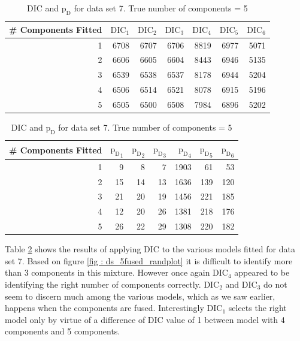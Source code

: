 \begin{table}[!htb]
\centering
\captionsetup{justification=centering}
\caption{DIC and $\text{p}_\text{D}$ for data set 7. True number of components = 5}
\label{table : ds_5fused_dic}
\begin{tabular}{@{}rrrrrrr@{}}
\toprule
\# Components Fitted & $\text{DIC}_1$ & $\text{DIC}_2$  & $\text{DIC}_3$  & $\text{DIC}_4$  & $\text{DIC}_5$  & $\text{DIC}_6$  \\ \midrule
1 & 6708 & 6707 & 6706 & 8819 & 6977 & 5071 \\
2 & 6606 & 6605 & 6604 & 8443 & 6946 & 5135 \\
3 & 6539 & 6538 & 6537 & 8178 & 6944 & 5204 \\
4 & 6506 & 6514 & 6521 & 8078 & 6915 & 5196 \\
5 & 6505 & 6500 & 6508 & 7984 & 6896 & 5202 \\
\bottomrule
\end{tabular}

\begin{tabular}{@{}rrrrrrr@{}}
\toprule
\# Components Fitted & ${\text{p}_\text{D}}_1$ & ${\text{p}_\text{D}}_2$ & ${\text{p}_\text{D}}_3$ & ${\text{p}_\text{D}}_4$ & ${\text{p}_\text{D}}_5$ & ${\text{p}_\text{D}}_6$ \\ \midrule
1 & 9 & 8 & 7 & 1903 & 61 & 53 \\
2 & 15 & 14 & 13 & 1636 & 139 & 120 \\
3 & 21 & 20 & 19 & 1456 & 221 & 185 \\
4 & 12 & 20 & 26 & 1381 & 218 & 176 \\
5 & 26 & 22 & 29 & 1308 & 220 & 182 \\
\bottomrule
\end{tabular}
\end{table}

Table \ref{table : ds_5fused_dic} shows the results of applying DIC to the various models fitted for data set 7. Based on figure \ref{fig : ds_5fused_randplot} it is difficult to identify more than 3 components in this mixture. However once again $\text{DIC}_4$ appeared to be identifying the right number of components correctly. $\text{DIC}_2$ and $\text{DIC}_3$ do not seem to discern much among the various models, which as we saw earlier, happens when the components are fused. Interestingly $\text{DIC}_1$ selects the right model only by virtue of a difference of DIC value of 1 between model with 4 components and 5 components.\\


